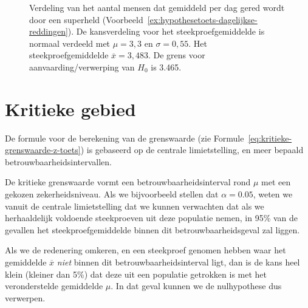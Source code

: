 \begin{figure}
  \centering
  \caption{Verdeling van het aantal mensen dat gemiddeld per dag gered wordt door een superheld (Voorbeeld~\ref{ex:hypothesetoets-dagelijkse-reddingen}). De kansverdeling voor het steekproefgemiddelde is normaal verdeeld met $\mu = 3,3$ en $\sigma = 0,55$. Het steekproefgemiddelde $\overline{x} =3,483$. De grens voor aanvaarding/verwerping van $H_{0}$ is 3.465.}
  \label{fig:hypothesetoets-reddingen-per-dag}
\end{figure}

\section{Kritieke gebied}
\label{sec:kritieke-gebied}

De formule voor de berekening van de grenswaarde (zie Formule~\ref{eq:kritieke-grenswaarde-z-toets}) is gebaseerd op de centrale limietstelling, en meer bepaald betrouwbaarheidsintervallen.

De kritieke grenswaarde vormt een betrouwbaarheidsinterval rond $\mu$ met een gekozen zekerheidsniveau. Als we bijvoorbeeld stellen dat $\alpha = 0.05$, weten we vanuit de centrale limietstelling dat we kunnen verwachten dat als we herhaaldelijk voldoende steekproeven uit deze populatie nemen, in 95\% van de gevallen het steekproefgemiddelde binnen dit betrouwbaarheidsgeval zal liggen.

Als we de redenering omkeren, en een steekproef genomen hebben waar het gemiddelde $\overline{x}$ \emph{niet} binnen dit betrouwbaarheidsinterval ligt, dan is de kans heel klein (kleiner dan 5\%) dat deze uit een populatie getrokken is met het veronderstelde gemiddelde $\mu$. In dat geval kunnen we de nulhypothese dus verwerpen.

